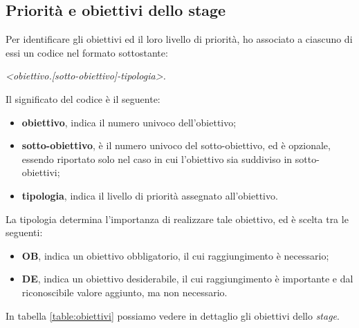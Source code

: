 \subsection{Priorità e obiettivi dello stage}
Per identificare gli obiettivi ed il loro livello di priorità, ho associato a ciascuno di essi un codice nel formato sottostante:
\\
\begin{center}
	\textit{<obiettivo.[sotto-obiettivo]-tipologia>. }
\end{center}

Il significato del codice è il seguente:
\begin{itemize}
\item \textbf{obiettivo}, indica il numero univoco dell'obiettivo;
\item \textbf{sotto-obiettivo}, è il numero univoco del sotto-obiettivo, ed è opzionale, essendo riportato solo nel caso in cui l'obiettivo sia suddiviso in sotto-obiettivi;
\item \textbf{tipologia}, indica il livello di priorità assegnato all'obiettivo.
\end{itemize}
La tipologia determina l'importanza di realizzare tale obiettivo, ed è scelta tra le seguenti:
\begin{itemize}
	\item \textbf{OB}, indica un obiettivo obbligatorio, il cui raggiungimento è necessario;
	\item \textbf{DE}, indica un obiettivo desiderabile, il cui raggiungimento è importante e dal riconoscibile valore aggiunto, ma non necessario.
\end{itemize}

In tabella \ref{table:obiettivi} possiamo vedere in dettaglio gli obiettivi dello \textit{stage}.

